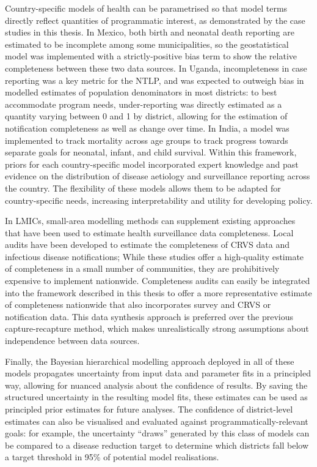 \documentclass[
]{report}
\begin{document}
Country-specific models of health can be parametrised so that model terms directly reflect quantities of programmatic interest, as demonstrated by the case studies in this thesis. In Mexico, both birth and neonatal death reporting are estimated to be incomplete among some municipalities,\autocite{Hernandez2012,Enciso2017} so the geostatistical model was implemented with a strictly-positive bias term to show the relative completeness between these two data sources. In Uganda, incompleteness in case reporting was a key metric for the NTLP,\autocite{UgandaNationalTuberculosisandLeprosyProgramme2020} and was expected to outweigh bias in modelled estimates of population denominators in most districts: to best accommodate program needs, under-reporting was directly estimated as a quantity varying between 0 and 1 by district, allowing for the estimation of notification completeness as well as change over time. In India, a model was implemented to track mortality across age groups to track progress towards separate goals for neonatal, infant, and child survival. Within this framework, priors for each country-specific model incorporated expert knowledge and past evidence on the distribution of disease aetiology and surveillance reporting across the country. The flexibility of these models allows them to be adapted for country-specific needs, increasing interpretability and utility for developing policy.

In LMICs, small-area modelling methods can supplement existing approaches that have been used to estimate health surveillance data completeness. Local audits have been developed to estimate the completeness of CRVS data and infectious disease notifications;\autocite{DeFrias2013,Szwarcwald2014,DeAlmeida2017a,NationalAdminstrativeDepartmentofStatisticsDANE2006,Hernandez2012} While these studies offer a high-quality estimate of completeness in a small number of communities, they are prohibitively expensive to implement nationwide. Completeness audits can easily be integrated into the framework described in this thesis to offer a more representative estimate of completeness nationwide that also incorporates survey and CRVS or notification data. This data synthesis approach is preferred over the previous capture-recapture method, which makes unrealistically strong assumptions about independence between data sources.\autocite{Tilling2001,Cormack1999}

Finally, the Bayesian hierarchical modelling approach deployed in all of these models propagates uncertainty from input data and parameter fits in a principled way, allowing for nuanced analysis about the confidence of results.\autocite{McElreath2016} By saving the structured uncertainty in the resulting model fits, these estimates can be used as principled prior estimates for future analyses. The confidence of district-level estimates can also be visualised and evaluated against programmatically-relevant goals: for example, the uncertainty ``draws'' generated by this class of models can be compared to a disease reduction target to determine which districts fall below a target threshold in 95\% of potential model realisations.\autocite{Patil2011}
\end{document}
